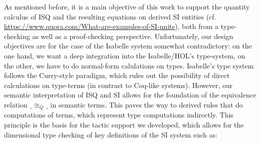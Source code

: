 \documentclass[11pt,a4paper]{book}
\begin{document}
As mentioned before,  it is a main objective of this work to support the quantity calculus of ISQ 
and the resulting  equations on derived SI entities 
(cf. \url{https://www.quora.com/What-are-examples-of-SI-units}),
both from a type-checking as well as a proof-checking perspective.
Unfortunately, our design objectives are for the case of the Isabelle system somewhat contradictory:
on the one hand, we want a deep integration into the Isabelle/HOL's type-system,
on the other, we have to do normal-form calulations on types.
Isabelle's type system follows the Curry-style paradigm, which rules out the possibility
of direct calculations on type-terms (in contrast to Coq-like systems). However, our semantic
interpretation of ISQ and SI allows for the foundation of the equivalence relation $\_\cong_{Q}\_$
in semantic terms. This paves the way to derived rules that do computations of terms, which
represent type computations indirectly. This principle is the basis for the tactic support we 
developed, which allows for the dimensional type checking of key definitions of the SI 
system such as:
\end{document}
